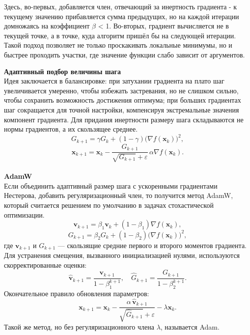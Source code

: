 \documentclass[a4paper]{article}
\begin{document}
Здесь, во-первых, добавляется член, отвечающий за инертность градиента - к текущему значению прибавляется сумма предыдущих, но на каждой итерации домножаясь на коэффициент $\beta$ < 1. Во-вторых, градиент вычисляется не в текущей точке, а в точке, куда алгоритм пришёл бы на следующей итерации.\\
Такой подход позволяет не только проскакивать локальные минимумы, но и быстрее проходить участки, где значение функции слабо зависит от аргументов.

\textbf{Адаптивный подбор величины шага}\\
Идея заключается в балансировке: при затухании градиента на плато шаг увеличивается умеренно, чтобы избежать застревания, но не слишком сильно, чтобы сохранить возможность достижения оптимума; при больших градиентах шаг сокращается для точной настройки, компенсируя экстремальные значения компонент градиента. Для придания инертности размеру шага складываются не нормы градиентов, а их скользящее среднее.
\begin{equation}
G_{k+1} = \mathit{\gamma} G_k + (1 - \mathit{\gamma}) \bigl( \nabla f(\mathbf{x}_k) \bigr)^2, 
\end{equation}
\begin{equation}
\mathbf{x}_{k+1} = \mathbf{x}_k - \frac{G_{k+1}}{\sqrt{G_{k+1}} + \varepsilon} \, \alpha \nabla f(\mathbf{x}_k).
\end{equation}\\

\textbf{AdamW}\\
Если объединить адаптивный размер шага с ускоренными градиентами Нестерова, добавить регуляризационный член, то получится метод AdamW, который считается решением по умолчанию в задачах стохастической оптимизации. 
\[
\mathbf{v}_{k+1} = \mathit{\beta}_1 \mathbf{v}_k + (1 - \mathit{\beta}_1) \nabla f(\mathbf{x}_k),
\]
\[
G_{k+1} = \mathit{\beta}_2 G_k + (1 - \mathit{\beta}_2) \bigl( \nabla f(\mathbf{x}_k) \bigr)^2,
\]
где $\mathbf{v}_{k+1}$ и $G_{k+1}$ — скользящие средние первого и второго моментов градиента. Для устранения смещения, вызванного инициализацией нулями, используются скорректированные оценки:
\[
\widehat{\mathbf{v}}_{k+1} = \frac{\mathbf{v}_{k+1}}{1 - \mathit{\beta}_1^{k+1}}, \quad \widehat{G}_{k+1} = \frac{G_{k+1}}{1 - \mathit{\beta}_2^{k+1}}.
\]
Окончательное правило обновления параметров:
\[
\mathbf{x}_{k+1} = \mathbf{x}_k - \dfrac{\alpha \, \widehat{\mathbf{v}}_{k+1}}{\sqrt{\widehat{G}_{k+1}} + \varepsilon} - \lambda \mathbf{x}_k.
\]
Такой же метод, но без регуляризационного члена $\lambda$, называется Adam.
\end{document}
